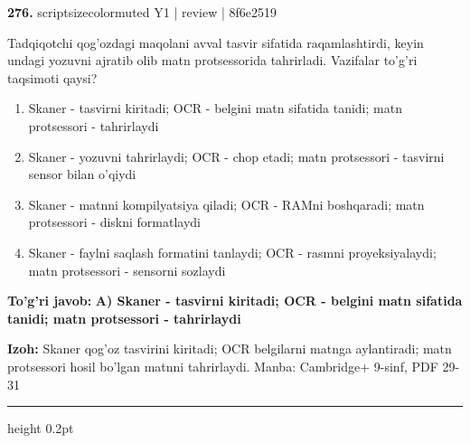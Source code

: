 \documentclass[10pt,a4paper]{article}
\begin{document}
{\bfseries\sffamily\color{ink} 276.} {scriptsizecolor{muted} Y1 | review | 8f6e2519}
\par
Tadqiqotchi qog'ozdagi maqolani avval tasvir sifatida raqamlashtirdi, keyin undagi yozuvni ajratib olib matn protsessorida tahrirladi. Vazifalar to'g'ri taqsimoti qaysi?
\begin{enumerate}[label=\Alph*),leftmargin=9mm]
\item Skaner - tasvirni kiritadi; OCR - belgini matn sifatida tanidi; matn protsessori - tahrirlaydi
\item Skaner - yozuvni tahrirlaydi; OCR - chop etadi; matn protsessori - tasvirni sensor bilan o'qiydi
\item Skaner - matnni kompilyatsiya qiladi; OCR - RAMni boshqaradi; matn protsessori - diskni formatlaydi
\item Skaner - faylni saqlash formatini tanlaydi; OCR - rasmni proyeksiyalaydi; matn protsessori - sensorni sozlaydi
\end{enumerate}
\begin{tcolorbox}[enhanced,breakable,colback=teal!4,colframe=teal!60!black,boxrule=0.45pt,arc=1.2mm,left=2.7mm,right=2.7mm,top=1.8mm,bottom=1.8mm,before skip=2mm,after skip=2mm]
{\bfseries\sffamily\color{teal}To'g'ri javob:} \textbf{A) Skaner - tasvirni kiritadi; OCR - belgini matn sifatida tanidi; matn protsessori - tahrirlaydi}
\par\smallskip
{\bfseries Izoh:} Skaner qog'oz tasvirini kiritadi; OCR belgilarni matnga aylantiradi; matn protsessori hosil bo'lgan matnni tahrirlaydi. Manba: Cambridge+ 9-sinf, PDF 29-31
\end{tcolorbox}
\vspace{2mm}\hrule height 0.2pt\vspace{3mm}
\end{document}

